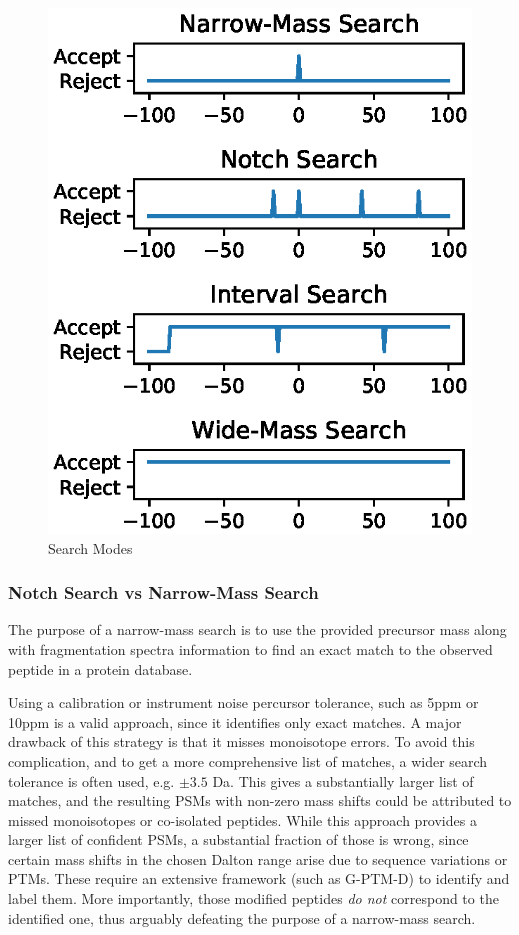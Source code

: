 \documentclass[journal=jprobs,manuscript=article]{achemso}
\begin{document}
\begin{figure}
\includegraphics{fig1-searchTypes.eps}
\caption{Search Modes}
\label{fig:fig1-searchtypes}
\end{figure}

\subsubsection{Notch Search vs Narrow-Mass Search}

The purpose of a narrow-mass search is to use the provided precursor mass along with fragmentation spectra information to find an exact match to the observed peptide in a protein database.

Using a calibration or instrument noise percursor tolerance, such as 5ppm or 10ppm is a valid approach, since it identifies only exact matches.
A major drawback of this strategy is that it misses monoisotope errors.
To avoid this complication, and to get a more comprehensive list of matches, a wider search tolerance is often used, e.g. $\pm 3.5$ Da.
This gives a substantially larger list of matches, and the resulting PSMs with non-zero mass shifts could be attributed to missed monoisotopes or co-isolated peptides.
While this approach provides a larger list of confident PSMs, a substantial fraction of those is wrong, since certain mass shifts in the chosen Dalton range arise due to sequence variations or PTMs.
These require an extensive framework (such as G-PTM-D) to identify and label them.
More importantly, those modified peptides \textit{do not} correspond to the identified one, thus arguably defeating the purpose of a narrow-mass search. 
\end{document}
